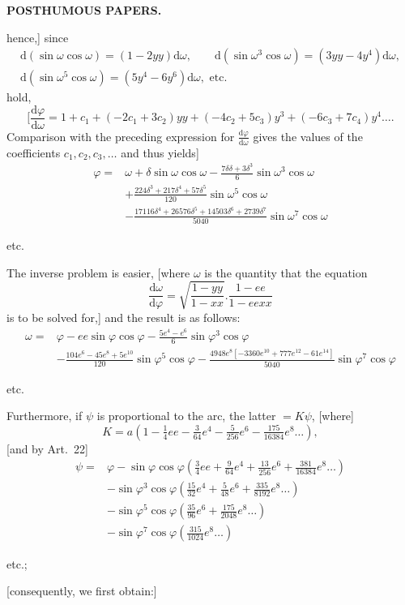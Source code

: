\par\clearpage
{}\hfill{\small\textbf{POSTHUMOUS PAPERS.}}\hfill\null\par\medskip
\noindent hence,] since
\[
\begin{gathered}
\mathrm d(\sin\omega\cos\omega)=(1-2yy)\mathrm d\omega,\qquad
\mathrm d(\sin\omega^3\cos\omega)=(3yy-4y^4)\mathrm d\omega,\\
\mathrm d(\sin\omega^5\cos\omega)=(5y^4-6y^6)\mathrm d\omega,\text{ etc.}
\end{gathered}
\]
\noindent hold,
\[
[\frac{\mathrm d\varphi}{\mathrm d\omega}=1+c_1+(-2c_1+3c_2)yy+(-4c_2+5c_3)y^3+(-6c_3+7c_4)y^4\ldots.
\]
Comparison with the preceding expression for \(\frac{\mathrm d\varphi}{\mathrm d\omega}\) gives the values of the coefficients \(c_1,c_2,c_3,\ldots\) and thus yields]
\[
\begin{aligned}
\varphi={}&\omega+\delta\sin\omega\cos\omega-\frac{7\delta\delta+3\delta^3}{6}\sin\omega^3\cos\omega\\
&+\frac{224\delta^3+217\delta^4+57\delta^5}{120}\sin\omega^5\cos\omega\\
&-\frac{17116\delta^4+26576\delta^5+14503\delta^6+2739\delta^7}{5040}\sin\omega^7\cos\omega
\end{aligned}
\]
{\centering etc.\par}
\bigskip
{\centering [24.]\par}
The inverse problem is easier, [where \(\omega\) is the quantity that the equation
\[
\frac{\mathrm d\omega}{\mathrm d\varphi}=\sqrt{\frac{1-yy}{1-xx}}.\frac{1-ee}{1-eexx}
\]
\noindent is to be solved for,] and the result is as follows:
\[
\begin{aligned}
\omega={}&\varphi-ee\sin\varphi\cos\varphi-\frac{5e^4-e^6}{6}\sin\varphi^3\cos\varphi\\
&-\frac{104e^6-45e^8+5e^{10}}{120}\sin\varphi^5\cos\varphi
-\frac{4948e^8[-3360e^{10}+777e^{12}-61e^{14}]}{5040}\sin\varphi^7\cos\varphi
\end{aligned}
\]
{\centering etc.\par}
Furthermore, if \(\psi\) is proportional to the arc, the latter \(=K\psi\), [where]
\[K=a(1-\tfrac14ee-\tfrac3{64}e^4-\tfrac5{256}e^6-\tfrac{175}{16384}e^8\ldots),\]
[and by Art.~22]
\[
\begin{aligned}
\psi={}&\varphi-\sin\varphi\cos\varphi(\tfrac34ee+\tfrac9{64}e^4+\tfrac{13}{256}e^6+\tfrac{381}{16384}e^8\ldots)\\
&-\sin\varphi^3\cos\varphi(\tfrac{15}{32}e^4+\tfrac5{48}e^6+\tfrac{335}{8192}e^8\ldots)\\
&-\sin\varphi^5\cos\varphi(\tfrac{35}{96}e^6+\tfrac{175}{2048}e^8\ldots)\\
&-\sin\varphi^7\cos\varphi(\tfrac{315}{1024}e^8\ldots)
\end{aligned}
\]
{\centering etc.;\par}
[consequently, we first obtain:]

